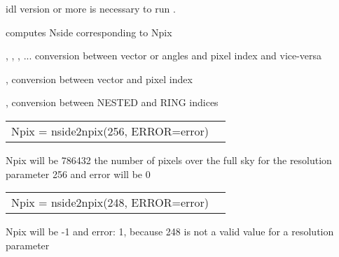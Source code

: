 \begin{related}
  \begin{sulist}{} %
    \item[idl] version \idlversion or more is necessary to run \facname.	
    \item[\htmlref{npix2nside}{idl:npix2nside}] computes Nside corresponding to Npix
    \item[\htmlref{pix2xxx}{idl:pix_tools}, \htmlref{ang2xxx}{idl:pix_tools}, \htmlref{vec2xxx}{idl:pix_tools}, ... ] conversion between vector or angles and pixel index and vice-versa
    \item[\htmlref{vec2pix}{idl:pix_tools}, \htmlref{pix2vec}{idl:pix_tools}] conversion between vector and pixel index
    \item[\htmlref{nest2ring}{idl:pix_tools}, \htmlref{ring2nest}{idl:pix_tools}] conversion between NESTED and RING indices
  \end{sulist}
\end{related}

\begin{example}
{
\begin{tabular}{ll} %
Npix = nside2npix(256, ERROR=error)
\end{tabular}
}
{
Npix will be 786432 the number of pixels over the full sky for the \healpix
resolution parameter 256 and error will be 0}
\end{example}
\begin{example}
{
\begin{tabular}{ll} %
Npix = nside2npix(248, ERROR=error)
\end{tabular}
}
{
Npix will be -1 and error: 1, because 248 is not a valid value for a \healpix
resolution parameter}
\end{example}


